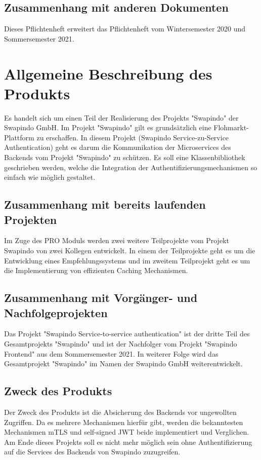 \documentclass[14pt,a4paper]{extarticle}
\begin{document}
	\subsection{Zusammenhang mit anderen Dokumenten}
	Dieses Pflichtenheft erweitert das Pflichtenheft vom Wintersemester 2020 und Sommersemester 2021.

	\section{Allgemeine Beschreibung des Produkts}
	Es handelt sich um einen Teil der Realisierung des Projekts "Swapindo" der Swapindo GmbH.
	Im Projekt "Swapindo" gilt es grundsätzlich eine Flohmarkt-Plattform zu erschaffen.
	In diesem Projekt (Swapindo Service-zu-Service Authentication) geht es darum die Kommunikation der Microservices des Backends vom Projekt "Swapindo" zu schützen.
	Es soll eine Klassenbibliothek geschrieben werden, welche die Integration der Authentifizierungsmechanismen so einfach wie möglich gestaltet.

	\subsection{Zusammenhang mit bereits laufenden Projekten}
	Im Zuge des PRO Moduls werden zwei weitere Teilprojekte vom Projekt Swapindo von zwei Kollegen entwickelt.
	In einem der Teilprojekte geht es um die Entwicklung eines Empfehlungssystems und im zweitem Teilprojekt geht es um die Implementierung von effizienten Caching Mechanismen.

	\subsection{Zusammenhang mit Vorgänger- und Nachfolgeprojekten}
	Das Projekt "Swapindo Service-to-service authentication" ist der dritte Teil des Gesamtprojekts "Swapindo" und ist der Nachfolger vom Projekt "Swapindo Frontend" aus dem Sommersemester 2021.
	In weiterer Folge wird das Gesamtprojekt "Swapindo" im Namen der Swapindo GmbH weiterentwickelt.

	\subsection{Zweck des Produkts}
	Der Zweck des Produkts ist die Absicherung des Backends vor ungewollten Zugriffen.
	Da es mehrere Mechanismen hierfür gibt, werden die bekanntesten Mechanismen mTLS und self-signed JWT beide implementiert und Verglichen.
	Am Ende dieses Projekts soll es nicht mehr möglich sein ohne Authentifizierung auf die Services des Backends von Swapindo zuzugreifen.
\end{document}

